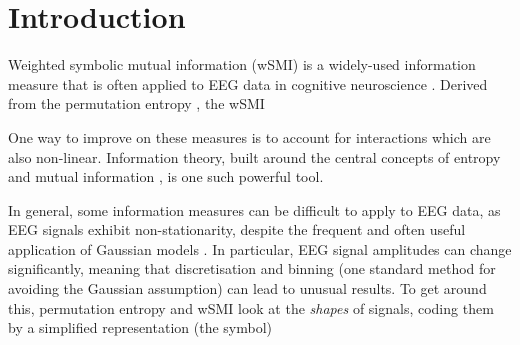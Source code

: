 \documentclass[journal]{IEEEtran}
\theoremstyle{definition}
\newif\ifreview
\newcommand{\added}[1]{\begingroup\ifreview\color{addition}\fi#1\endgroup}
\newcommand{\removed}[1]{\ifreview{\color{deletion}#1}\space\fi}
\begin{document}
\section{Introduction}
Weighted symbolic mutual information (wSMI) is a widely-used information measure that is often applied to EEG data in cognitive neuroscience \cite{king2013information, sitt2014large, imperatori2019eeg, gaubert2019eeg, imperatori2021cross, ding2023resting, van2024local, baki2024decision}. Derived from the permutation entropy \cite{bandt2002permutation}, the wSMI \removed{accounts for three challenging problems encountered with noisy EEG signals: stability under the presence of noise, non-linear interactions between signals, and accounting for volume conductance effects in EEG \texttt{[original citation: nobody]}.}

\removed{Early connectivity measures such as functional connectivity \cite{friston1993functional, friston1994functional, biswal1995functional} or EEG coupling \texttt{[original citation: nobody]} look at linear correlations and relationships between the time series of two different signals.} One way to improve on these measures is to account for interactions which are also non-linear. Information theory, built around the central concepts of entropy and mutual information \cite{shannon1948mathematical}, is one such powerful tool. \removed{Information-theoretic connectivity measures capture \textit{all} relationships between signals --- linear and non-linear.}

In general, some information measures can be difficult to apply to EEG data, as EEG signals exhibit non-stationarity, despite the frequent and often useful application of Gaussian models \cite{ince2017statistical}. In particular, EEG signal amplitudes can change significantly, meaning that discretisation and binning (one standard method for avoiding the Gaussian assumption) can lead to unusual results. To get around this, permutation entropy and wSMI look at the \textit{shapes} of signals, coding them by a simplified representation (the symbol) \removed{which is invariant to amplitude \cite{bandt2002permutation, king2013information}.}
\end{document}
